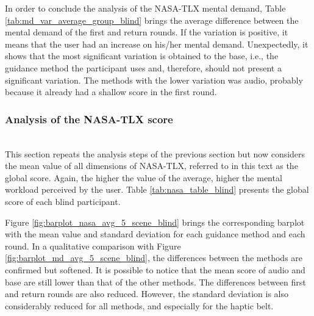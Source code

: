 

In order to conclude the analysis of the NASA-TLX mental demand, Table \ref{tab:md_var_average_group_blind} brings the average difference between the mental demand of the first and return rounds. If the variation is positive, it means that the user had an increase on his/her mental demand. Unexpectedly, it shows that the most significant variation is obtained to the base, i.e., the guidance method the participant uses and, therefore, should not present a significant variation. The methods with the lower variation was audio, probably because it already had a shallow score in the first round. 



\FloatBarrier



\subsubsection*{Analysis of the NASA-TLX score}\mbox{}\\

This section repeats the analysis steps of the previous section but now considers the mean value of all dimensions of NASA-TLX, referred to in this text as the global score. Again, the higher the value of the average, higher the mental workload perceived by the user. Table \ref{tab:nasa_table_blind} presents the global score of each blind participant. 



Figure \ref{fig:barplot_nasa_avg_5_scene_blind} brings the corresponding barplot with the mean value and standard deviation for each guidance method and each round. In a qualitative comparison with Figure \ref{fig:barplot_md_avg_5_scene_blind}, the differences between the methods are confirmed but softened. It is possible to notice that the mean score of audio and base are still lower than that of the other methods. The differences between first and return rounds are also reduced. However, the standard deviation is also considerably reduced for all methods, and especially for the haptic belt.


